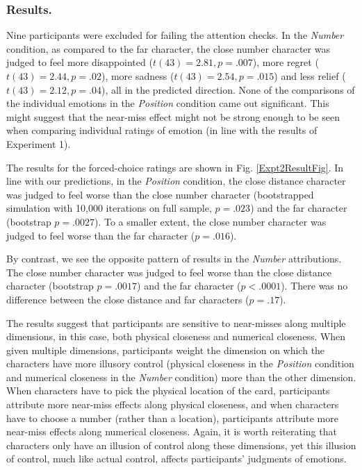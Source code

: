 \documentclass[10pt,letterpaper]{article}
\begin{document}
\subsubsection{Results.} Nine participants were excluded for failing the attention checks. In the \textit{Number} condition, as compared to the far character, the close number character was judged to feel more disappointed ($t(43)=2.81, p=.007$), more regret ($t(43)=2.44, p=.02$), more sadness ($t(43)=2.54, p=.015$) and less relief ($t(43)=2.12, p=.04$), all in the predicted direction. None of the comparisons of the individual emotions in the \textit{Position} condition came out significant. This might suggest that the near-miss effect might not be strong enough to be seen when comparing individual ratings of emotion (in line with the results of Experiment 1).


The results for the forced-choice ratings are shown in Fig. \ref{Expt2ResultFig}. In line with our predictions, in the \textit{Position} condition, the close distance character was judged to feel worse than the close number character (bootstrapped simulation with 10,000 iterations on full sample, $p=.023$) and the far character (bootstrap $p=.0027$). To a smaller extent, the close number character was judged to feel worse than the far character ($p=.016$). 

By contrast, we see the opposite pattern of results in the \textit{Number} attributions. The close number character was judged to feel worse than the close distance character (bootstrap $p=.0017$) and the far character ($p<.0001$). There was no difference between the close distance and far characters ($p=.17$). 


The results suggest that participants are sensitive to near-misses along multiple dimensions, in this case, both physical closeness and numerical closeness. When given multiple dimensions, participants weight the dimension on which the characters have more illusory control (physical closeness in the \textit{Position} condition and numerical closeness in the \textit{Number} condition) more than the other dimension. When characters have to pick the physical location of the card, participants attribute more near-miss effects along physical closeness, and when characters have to choose a number (rather than a location), participants attribute more near-miss effects along numerical closeness. Again, it is worth reiterating that characters only have an illusion of control along these dimensions, yet this illusion of control, much like actual control, affects participants' judgments of emotions.
\end{document}
